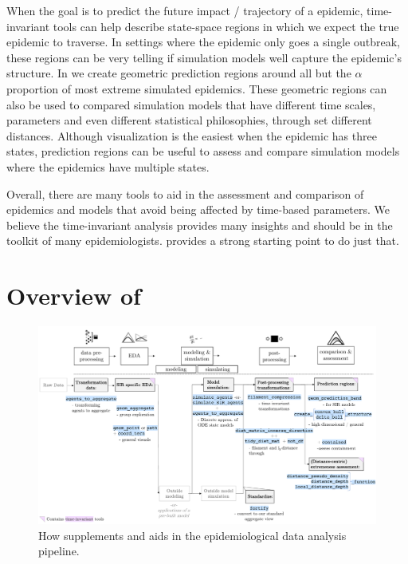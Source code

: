 \documentclass[
  shortnames]{jss}
\begin{document}
When the goal is to predict the future impact / trajectory of a
epidemic, time-invariant tools can help describe state-space regions in
which we expect the true epidemic to traverse. In settings where the
epidemic only goes a single outbreak, these regions can be very telling
if simulation models well capture the epidemic's structure. In
 we create geometric prediction regions around all but
the \(\alpha\) proportion of most extreme simulated epidemics. These
geometric regions can also be used to compared simulation models that
have different time scales, parameters and even different statistical
philosophies, through set different distances. Although visualization is
the easiest when the epidemic has three states, prediction regions can
be useful to assess and compare simulation models where the epidemics
have multiple states.

Overall, there are many tools to aid in the assessment and comparison of
epidemics and models that avoid being affected by time-based parameters.
We believe the time-invariant analysis provides many insights and should
be in the toolkit of many epidemiologists.  provides a
strong starting point to do just that.

\section[Package overview]{Overview of
}\label{sec:overview}

\afterpage{\clearpage}
\begin{figure}
    \centering
    \includegraphics[width = 1\textwidth]{images/pipeline2_1.pdf}
    \caption{How  supplements and aids in the epidemiological data analysis pipeline.}
    \label{fig:pipeline2}
\end{figure}
\end{document}
